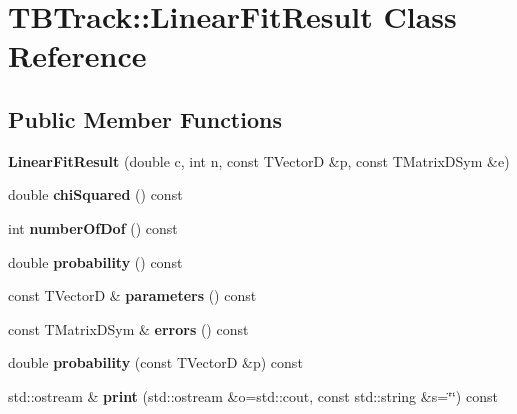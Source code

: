\section{T\-B\-Track\-:\-:Linear\-Fit\-Result Class Reference}
\label{classTBTrack_1_1LinearFitResult}
\subsection*{Public Member Functions}
\begin{DoxyCompactItemize}
\item 
{\bfseries Linear\-Fit\-Result} (double c, int n, const T\-Vector\-D \&p, const T\-Matrix\-D\-Sym \&e)\label{classTBTrack_1_1LinearFitResult_a3e4ba61e44c68bcf81db05f704d5d5b1}

\item 
double {\bfseries chi\-Squared} () const \label{classTBTrack_1_1LinearFitResult_a036042e6787c607d0ee51b20044d52b9}

\item 
int {\bfseries number\-Of\-Dof} () const \label{classTBTrack_1_1LinearFitResult_ab41a070ef6c6e60a04f44e1ad833caa3}

\item 
double {\bfseries probability} () const \label{classTBTrack_1_1LinearFitResult_a750253e1904b159bee301eceb5f09f80}

\item 
const T\-Vector\-D \& {\bfseries parameters} () const \label{classTBTrack_1_1LinearFitResult_ae0ed921b62f6653de3531a406335c7c2}

\item 
const T\-Matrix\-D\-Sym \& {\bfseries errors} () const \label{classTBTrack_1_1LinearFitResult_aaef15bed0282bc3f5e8e2e59f0d611d6}

\item 
double {\bfseries probability} (const T\-Vector\-D \&p) const \label{classTBTrack_1_1LinearFitResult_a1fa9bf5b974dd4a0bc5d692c66bd820b}

\item 
std\-::ostream \& {\bfseries print} (std\-::ostream \&o=std\-::cout, const std\-::string \&s=\char`\"{}\char`\"{}) const \label{classTBTrack_1_1LinearFitResult_adafd249c515c0a59daa63513c7a5fb1c}

\end{DoxyCompactItemize}
